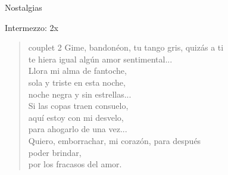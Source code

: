 \begin{song}{Nostalgias}
\begin{instrumental}{Intermezzo:}
 2x
\end{instrumental}

\begin{verse}{couplet 2}
	Gime, bandonéon, tu tango gris, quizás a ti\\
te hiera igual algún amor sentimental...\\
	Llora mi alma de fantoche,\\
	sola y triste en esta noche,\\
	noche negra y sin estrellas...\\
	Si las copas traen consuelo,\\
	aquí estoy con mi desvelo,\\
	para ahogarlo de  una vez...\hspace{2em} \\
	Quiero, emborrachar, mi corazón, para después\\
	poder brindar,\\
por los fracasos del amor.
\end{verse}


\end{song}
